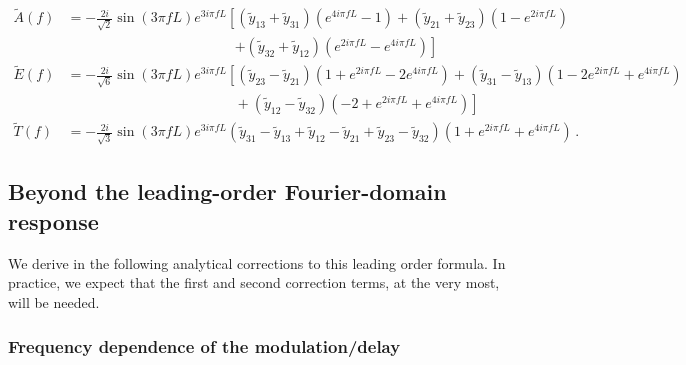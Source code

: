 \documentclass[aps,showpacs,%
prd,superscriptaddress,nofootinbib]{revtex4}
\newcommand{\nn}{\nonumber}
\begin{document}
\begin{widetext}
\begin{align}
	\tilde{A}(f) &= - \frac{2i}{\sqrt{2}} \sin\left(3\pi f L\right) e^{3 i \pi f L} \left[ \left( \tilde{y}_{13} + \tilde{y}_{31} \right) \left( e^{4i\pi f L} - 1 \right) + \left( \tilde{y}_{21} + \tilde{y}_{23} \right) \left( 1 - e^{2i\pi f L} \right) \right. \nn\\
	& \qquad\qquad\qquad\qquad\qquad\qquad \left. + \left( \tilde{y}_{32} + \tilde{y}_{12} \right) \left( e^{2i\pi f L} - e^{4i\pi f L} \right) \right] \nn\\
	\tilde{E}(f) &= - \frac{2i}{\sqrt{6}} \sin\left(3\pi f L\right) e^{3 i \pi f L} \left[ \left( \tilde{y}_{23} - \tilde{y}_{21} \right) \left( 1 + e^{2i\pi f L} - 2e^{4i \pi f L} \right) + \left( \tilde{y}_{31} - \tilde{y}_{13} \right) \left( 1 - 2e^{2i\pi f L} + e^{4i \pi f L} \right) \right. \nn\\
	& \qquad\qquad\qquad\qquad\qquad\qquad + \left( \tilde{y}_{12} - \tilde{y}_{32} \right) \left( -2 + e^{2i\pi f L} + e^{4i \pi f L} \right) \left. \right] \nn\\
	\tilde{T}(f) &= - \frac{2i}{\sqrt{3}} \sin\left(3\pi f L\right) e^{3 i \pi f L} \left( \tilde{y}_{31} - \tilde{y}_{13} + \tilde{y}_{12} - \tilde{y}_{21} + \tilde{y}_{23} - \tilde{y}_{32} \right) \left( 1 + e^{2i\pi f L} + e^{4i \pi f L} \right) \,.
\end{align}
\end{widetext}
%


\subsection{Beyond the leading-order Fourier-domain response}
\label{appsubsec:nloresponse}

We derive in the following analytical corrections to this leading order formula. In practice, we expect that the first and second correction terms, at the very most, will be needed.

\subsubsection*{Frequency dependence of the modulation/delay}
\end{document}
